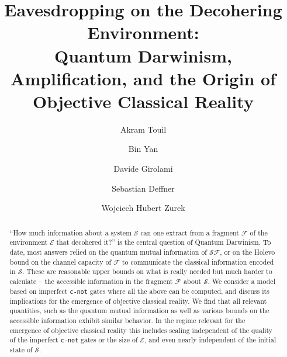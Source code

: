 \documentclass[aps,prl,showpacs,amsmath,amssymb,amsfonts,lengthcheck,twocolumn,longbibliography,superscriptaddress]{revtex4-2}
\newcommand{\cS}        {{\mathcal S}}
\newcommand{\cE}        {{\mathcal E}}
\newcommand{\+}         {\dagger}
\newcommand\cF{{\mathcal F}}
\begin{document}
\title{Eavesdropping on the Decohering Environment:\\ Quantum Darwinism, Amplification, and the Origin of Objective Classical Reality}

\author{Akram Touil}

\author{Bin Yan}

\author{Davide Girolami}

\author{Sebastian Deffner}

\author{Wojciech Hubert Zurek}


	
\begin{abstract} 
``How much information about a system $\cS$ can one extract from a fragment $\cF$ of the environment $\cE$ that decohered it?'' is the central question of Quantum Darwinism. To date, most answers relied on the quantum mutual information of $\cS\cF$, or on the Holevo bound on the channel capacity of $\mathcal{F}$ to communicate the classical information encoded in $\mathcal{S}$. These are reasonable upper bounds on what is really needed but much harder to calculate -- the accessible information in the fragment $\cF$ about $\cS$. We consider a model based on imperfect {\tt c-not} gates where all the above can be computed, and discuss its implications for the emergence of objective classical reality. We find that all relevant quantities, such as the quantum mutual information as well as various bounds on the accessible information exhibit similar behavior. In the regime relevant for the emergence of objective classical reality this includes scaling independent of the quality 
of the imperfect {\tt c-not} gates or the size of $\cE$, and even nearly independent of the initial state of $\cS$. 
\end{abstract}
\end{document}
